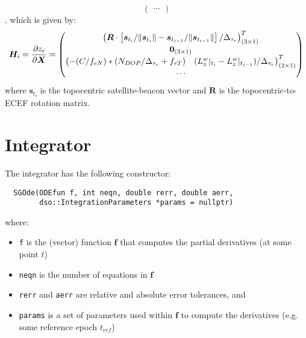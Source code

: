 \begin{enumerate}
\begin{equation}
\begin{pmatrix}
            \cdots
          \end{pmatrix} 
          \end{equation}
        , which is given by:
        \begin{equation}
            \bm{H}_i = \frac{\partial z_i}{\partial \bm{X}} = 
            \begin{pmatrix} 
                \begin{pmatrix}
                     \bm{R} \cdot \left[ \bm{s}_{t_i} / \lVert\bm{s}_{t_i}\rVert - 
                     \bm{s}_{t_{i-1}} / \lVert\bm{s}_{t_{i-1}}\rVert \right] / \Delta _{\tau_r} \end{pmatrix}^T_{(3 \times 1)} \\
                 \bm{0}_{(3 \times 1)} \\
                 \begin{pmatrix} -(C / f_{eN}) * (N_{DOP} / \Delta _{\tau_r}  + f_{rT}) & (L^w_z|_{t_i} - L^w_z|_{t_{i-1}}) / \Delta _{\tau_r} \end{pmatrix}^T_{(2 \times 1)} \\
                 \cdots
            \end{pmatrix}
        \end{equation}
        where $\bm{s}_{t_i}$ is the topocentric satellite-beacon vector and 
        $\bm{R}$ is the topocentric-to-ECEF rotation matrix.
\end{enumerate}

\section{Integrator}
\label{sec:Integrator}

The integrator has the following constructor:
\begin{lstlisting}
  SGOde(ODEfun f, int neqn, double rerr, double aerr,                         
        dso::IntegrationParameters *params = nullptr)
\end{lstlisting}

where:
\begin{itemize}
    \item \label{it:odefun} \texttt{f} is the (vector) function $\bm{f}$ that 
        computes the partial derivatives (at some point $t$)
    \item \texttt{neqn} is the number of equations in $\bm{f}$
    \item \texttt{rerr} and \texttt{aerr} are relative and absolute error 
        tolerances, and
    \item \texttt{params} is a set of parameters used within $\bm{f}$ to 
        compute the derivatives (e.g. some reference epoch $t_{ref}$)
\end{itemize}

